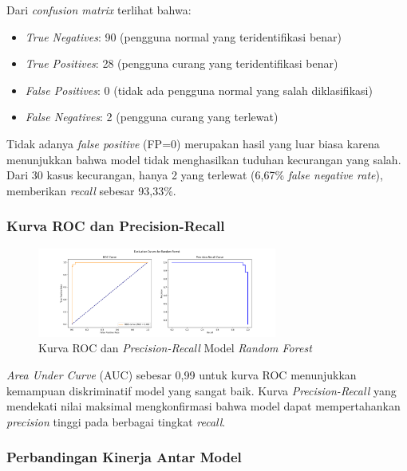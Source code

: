 Dari \textit{confusion matrix} terlihat bahwa:
\begin{itemize}
    \item \textit{True Negatives}: 90 (pengguna normal yang teridentifikasi benar)
    \item \textit{True Positives}: 28 (pengguna curang yang teridentifikasi benar)
    \item \textit{False Positives}: 0 (tidak ada pengguna normal yang salah diklasifikasi)
    \item \textit{False Negatives}: 2 (pengguna curang yang terlewat)
\end{itemize}

Tidak adanya \textit{false positive} (FP=0) merupakan hasil yang luar biasa karena menunjukkan bahwa model tidak menghasilkan tuduhan kecurangan yang salah. Dari 30 kasus kecurangan, hanya 2 yang terlewat (6,67\% \textit{false negative rate}), memberikan \textit{recall} sebesar 93,33\%.

\subsubsection{Kurva ROC dan Precision-Recall}

\begin{figure}[htbp]
    \centering
    \includegraphics[width=0.7\textwidth]{figures/curves_Random Forest.png}
    \caption{Kurva ROC dan \textit{Precision-Recall} Model \textit{Random Forest}}
    \label{fig:rocPRCurves}
\end{figure}

\textit{Area Under Curve} (AUC) sebesar 0,99 untuk kurva ROC menunjukkan kemampuan diskriminatif model yang sangat baik. Kurva \textit{Precision-Recall} yang mendekati nilai maksimal mengkonfirmasi bahwa model dapat mempertahankan \textit{precision} tinggi pada berbagai tingkat \textit{recall}.

\subsubsection{Perbandingan Kinerja Antar Model}

